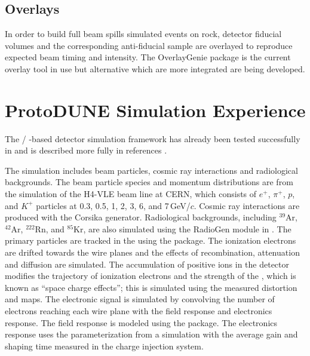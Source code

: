 \documentclass[../main-v1.tex]{subfiles}
\begin{document}
\subsection{Overlays}
In order to build full beam spills simulated events on rock, detector fiducial volumes and the corresponding anti-fiducial sample are overlayed to reproduce expected beam timing and intensity. The OverlayGenie package is the current overlay tool in use but alternative which are more integrated are being developed. 


\section{ProtoDUNE Simulation Experience }

The / -based  detector simulation framework has already been tested successfully in  and is described more fully in references \cite{DUNE:2021hwx,DUNE:2020cqd}.

The  simulation includes beam particles, cosmic ray interactions and radiological backgrounds. The beam particle species and momentum distributions are from the  simulation of the H4-VLE beam line at CERN, which consists of $e^{+}$, $\pi^{+}$, $p$, and $K^{+}$ particles at 0.3, 0.5, 1, 2, 3, 6, and 7\,GeV/$c$. Cosmic ray interactions are produced with the Corsika generator. Radiological backgrounds, including $^{39}$Ar, $^{42}$Ar, $^{222}$Rn, and $^{85}$Kr, are also simulated using the RadioGen module in . The primary particles are tracked in the  using the  package. 
The ionization electrons are drifted towards the wire planes %
and the effects of recombination, attenuation and diffusion are simulated. The accumulation of positive ions in the detector modifies the trajectory of ionization electrons and the strength of the \efield, which is 
known as ``space charge effects''; this is simulated using the measured distortion and \efield maps. The electronic signal is simulated by convolving the number of electrons reaching each wire plane with the field response and electronics response. The field response is modeled using the \cite{Veenhof:1998tt} package. 
The electronics response uses the parameterization from a  simulation with the average gain and shaping time measured in the  charge injection system. 
\end{document}

